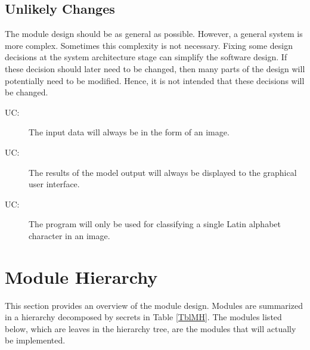 \documentclass[12pt, titlepage]{article}
\newcounter{ucnum}
\newcommand{\uctheucnum}{UC\theucnum}
\begin{document}

\subsection{Unlikely Changes} \label{SecUchange}

The module design should be as general as possible. However, a general system is
more complex. Sometimes this complexity is not necessary. Fixing some design
decisions at the system architecture stage can simplify the software design. If
these decision should later need to be changed, then many parts of the design
will potentially need to be modified. Hence, it is not intended that these
decisions will be changed.

\begin{description}
\item[ \uctheucnum \label{ucInput}:] The input data will
always be in the form of an image.
\item[ \uctheucnum \label{ucOutput}:] The results of the
model output will always be displayed to the graphical user interface.
\item[ \uctheucnum \label{ucPurpose}:] The program will
only be used for classifying a single Latin alphabet character in an image.
\end{description}

\section{Module Hierarchy} \label{SecMH}

This section provides an overview of the module design. Modules are summarized
in a hierarchy decomposed by secrets in Table \ref{TblMH}. The modules listed
below, which are leaves in the hierarchy tree, are the modules that will
actually be implemented.
\end{document}

